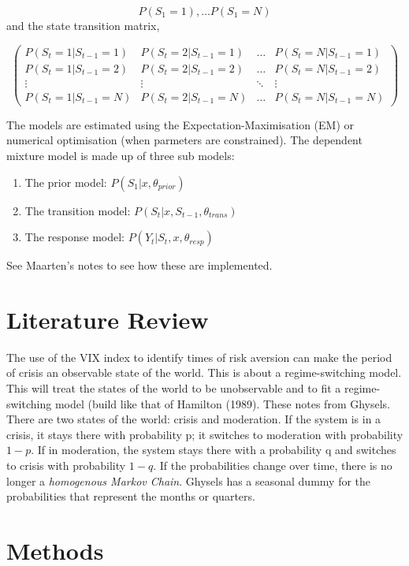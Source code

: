 \documentclass[12pt, a4paper, oneside]{article} %
\begin{document}
\begin{equation*}
P(S_1 = 1), \dots P(S_1 = N)
\end{equation*}
and the state transition matrix, 

\begin{equation*}
\begin{pmatrix}
P(S_t = 1|S_{t-1}=1) & P(S_t = 2|S_{t-1}=1) & \dots & P(S_t = N|S_{t-1}=1)\\
P(S_t = 1|S_{t-1}=2) & P(S_t = 2|S_{t-1}=2) & \dots & P(S_t = N|S_{t-1}=2)\\
\vdots & \vdots & \ddots & \vdots \\
P(S_t = 1|S_{t-1}=N) & P(S_t = 2|S_{t-1}=N) & \dots & P(S_t = N|S_{t-1}=N)
\end{pmatrix}
\end{equation*}

The models are estimated using the Expectation-Maximisation (EM) or numerical optimisation (when parmeters are constrained).  The dependent mixture model is made up of three sub models:  
\begin{enumerate}
\item The prior model: $P(S_1|x, \theta_{prior})$
\item The transition model: $P(S_t|x, S_{t-1}, \theta_{trans})$
\item The response model: $P(Y_t| S_t, x, \theta_{resp})$
\end{enumerate}
 See Maarten's notes to see how these are implemented.  

\section{Literature Review}
The use of the VIX index to identify times of risk aversion can make the period of crisis an observable state of the world. This is about a regime-switching model. This will treat the states of the world to be unobservable and to fit a regime-switching model (build like that of Hamilton (1989).  These notes from Ghysels.  There are two states of the world:  crisis and moderation.  If the system is in a crisis, it stays there with probability p; it switches to moderation with probability $1-p$.  If in moderation, the system stays there with a probability q and switches to crisis with probability $1-q$.  If the probabilities change over time, there is no longer a \emph{homogenous Markov Chain}. Ghysels has a seasonal dummy for the probabilities that represent the months or quarters.  

\section{Methods}
\end{document}
